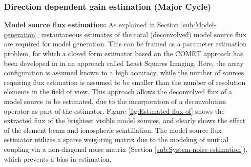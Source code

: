 \documentclass{aa}
\begin{document}
\subsubsection{\label{sub:Direction-dependent-gain}Direction dependent gain estimation
(Major Cycle)}

\textbf{Model   source  flux   estimation:}  As   explained   in  Section
\ref{sub:Model-generation}, instantaneous  estimates of the  total (deconvolved)
model source  flux are required for model  generation.  This can be  framed as a
parameter estimation  problem, for  which a closed  form estimator based  on the
COMET  approach has  been  developed in  \citep{wijnholds2008fundamental} in  an
approach called Least Squares Imaging.  Here, the array configuration is assumed
known to a high accuracy, while  the number of sources requiring flux estimation
is assumed to be smaller than the  number of resolution elements in the field of
view.   This approach  allows  the deconvolved  flux  of a  model  source to  be
estimated, due to  the incorporation of a deconvolution operator  as part of the
estimator. Figure  \ref{fig:Estimated-flux-of} shows  the extracted flux  of the
brightest visible  model sources,  and clearly shows  the effect of  the element
beam and ionospheric scintillation.  The  model source flux estimator utilizes a
sparse  weighting  matrix  due  to   the  modeling  of  mutual  coupling  via  a
non-diagonal noise matrix (Section \ref{sub:System-noise-estimation}), which prevents a bias in estimation.
\end{document}
